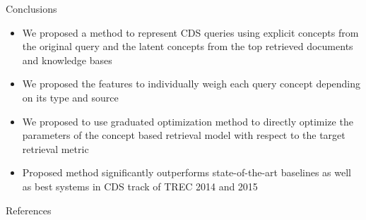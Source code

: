 \documentclass[final]{beamer}
\newlength{\onecolwid}
\begin{document}
\begin{frame}[t]
\begin{columns}[t]
\begin{column}{\onecolwid}

\begin{block}{Conclusions}
\begin{itemize}
\item We proposed a method to represent CDS queries using explicit concepts from the original query and the latent concepts from the top retrieved documents and knowledge bases
\item We proposed the features to individually weigh each query concept depending on its type and source
\item We proposed to use graduated optimization method to directly optimize the parameters of the concept based retrieval model with respect to the target retrieval metric
\item Proposed method significantly outperforms state-of-the-art baselines as well as best systems in CDS track of TREC 2014 and 2015
\end{itemize}

\end{block}



\begin{block}{References}

\nocite{*} %
\small{
\vspace{0.75in}}

\end{block}






\end{column}
\end{columns}
\end{frame}
\end{document}
